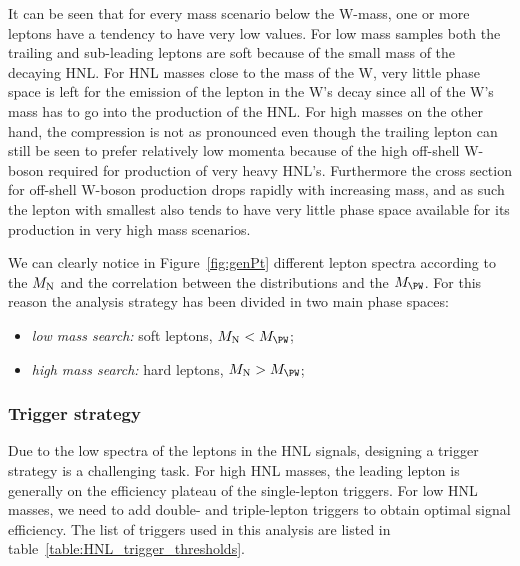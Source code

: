 It can be seen that for every mass scenario below the W-mass, one or
more leptons have a tendency to have very low \pt values. For low mass
samples both the trailing and sub-leading leptons are soft because of
the small mass of the decaying HNL. For HNL masses close to the mass of
the W, very little phase space is left for the emission of the lepton
in the W's decay since all of the W's mass has to go into the
production of the HNL. For high masses on the other hand, the
compression is not as pronounced even though the trailing lepton can
still be seen to prefer relatively low momenta because of the high off-shell W-boson required for production of very heavy
HNL's. Furthermore the cross section for off-shell W-boson production drops
rapidly with increasing mass, and as such the lepton with smallest \pt
also tends to have very little phase space available for its production in
very high mass scenarios.

We can clearly notice in Figure~\ref{fig:genPt} different lepton \pt spectra according to the
$M_\mathrm{N}$ and the correlation between the distributions and the $M_\PW$. For this reason the analysis
strategy has been divided in two main phase spaces:
\begin{itemize}
\setlength\itemsep{-0.2em}
\item \emph{low mass search:} soft leptons, $M_\hnl < M_\PW$;
\item \emph{high mass search:} hard leptons, $M_\hnl > M_\PW$;
\end{itemize}

\subsubsection{Trigger strategy}
Due to the low \pt spectra of the leptons in the HNL signals, designing a trigger strategy is a challenging task. 
For high HNL masses, the leading lepton \pt is generally on the efficiency plateau of the single-lepton triggers.
For low HNL masses, we need to add double- and triple-lepton triggers to obtain optimal signal efficiency.
The list of triggers used in this analysis are listed in table~\ref{table:HNL_trigger_thresholds}.


